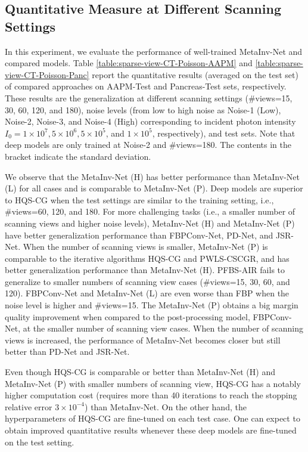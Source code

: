 \documentclass[journal,twoside]{IEEEtran}
\begin{document}
\subsection{Quantitative Measure at Different Scanning Settings}
In this experiment, we evaluate the performance of well-trained MetaInv-Net and compared models. Table \ref{table:sparse-view-CT-Poisson-AAPM} and \ref{table:sparse-view-CT-Poisson-Panc} report the quantitative results (averaged on the test set) of compared approaches on AAPM-Test and Pancreas-Test sets, respectively. These results are the generalization at different scanning settings (\#views=15, 30, 60, 120, and 180), noise levels (from low to high noise as Noise-1 (Low),  Noise-2,  Noise-3, and Noise-4 (High) corresponding to incident photon intensity $I_0=1\times 10^7, 5\times 10^6, 5\times 10^5$, and $1\times 10^5$, respectively), and test sets. Note that deep models are only trained at Noise-2 and \#views=180. The contents in the bracket indicate the standard deviation. 


We observe that the MetaInv-Net (H) has better performance than MetaInv-Net (L) for all cases and is comparable to MetaInv-Net (P). Deep models are superior to HQS-CG when the test settings are similar to the training setting, i.e., \#views=60, 120, and 180. For more challenging tasks (i.e., a smaller number of scanning views and higher noise levels), MetaInv-Net (H) and MetaInv-Net (P) have better generalization performance than FBPConv-Net, PD-Net, and JSR-Net. When the number of scanning views is smaller,  MetaInv-Net (P) is comparable to the iterative algorithms HQS-CG and PWLS-CSCGR, and has better generalization performance than MetaInv-Net (H). PFBS-AIR fails to generalize to smaller numbers of scanning view cases (\#views=15, 30, 60, and 120). FBPConv-Net and MetaInv-Net (L) are even worse than FBP when the noise level is higher and \#views=15. The MetaInv-Net (P) obtains a big margin quality improvement when compared to the post-processing model, FBPConv-Net, at the smaller number of scanning view cases. When the number of scanning views is increased, the performance of MetaInv-Net becomes closer but still better than PD-Net and JSR-Net.


Even though HQS-CG is comparable or better than MetaInv-Net (H) and MetaInv-Net (P) with smaller numbers of scanning view, HQS-CG has a notably higher computation cost (requires more than 40 iterations to reach the stopping relative error $3\times 10^{-4}$) than MetaInv-Net. On the other hand, the hyperparameters of HQS-CG are fine-tuned on each test case. One can expect to obtain improved quantitative results whenever these deep models are fine-tuned on the test setting.
\end{document}
